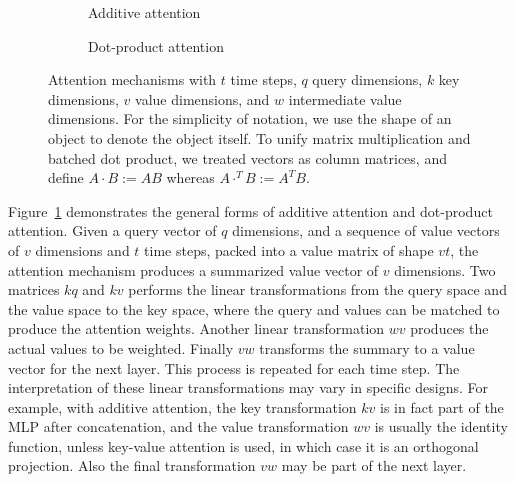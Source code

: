 \documentclass[11pt]{article}
\DeclareMathOperator{\softmax}{softmax}
\begin{document}
\begin{figure}
\begin{subfigure}{0.5\textwidth}
\centering
{}
\caption*{Additive attention}
\end{subfigure}%
\begin{subfigure}{0.5\textwidth}
\centering
{}
\caption*{Dot-product attention}
\end{subfigure}
\caption[]{\label{fig:attention}Attention mechanisms with
\(t\) time steps, \(q\) query dimensions, \(k\) key dimensions,
\(v\) value dimensions, and \(w\) intermediate value dimensions.
For the simplicity of notation,
we use the shape of an object to denote the object itself.
To unify matrix multiplication and batched dot product,
we treated vectors as column matrices,
and define \(A \cdot B := A B\)
whereas \(A \cdot^{T} B := A^{T} B\).}
\end{figure}

Figure~\ref{fig:attention} demonstrates the general forms of additive attention and dot-product attention.
Given a query vector of \(q\) dimensions,
and a sequence of value vectors of \(v\) dimensions and \(t\) time steps,
packed into a value matrix of shape \(vt\),
the attention mechanism produces a summarized value vector of \(v\) dimensions.
Two matrices \(kq\) and \(kv\) performs the linear transformations
from the query space and the value space to the key space,
where the query and values can be matched to produce the attention weights.
Another linear transformation \(wv\) produces the actual values to be weighted.
Finally \(vw\) transforms the summary to a value vector for the next layer.
This process is repeated for each time step.
The interpretation of these linear transformations may vary in specific designs.
For example, with additive attention,
the key transformation \(kv\) is in fact part of the MLP after concatenation,
and the value transformation \(wv\) is usually the identity function,
unless key-value attention is used, in which case it is an orthogonal projection.
Also the final transformation \(vw\) may be part of the next layer.
\end{document}

